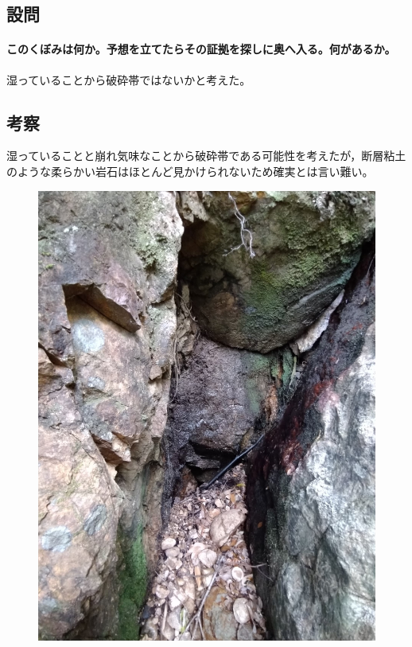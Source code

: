 \documentclass[uplatex,b5paper]{jsreport}
\begin{document}
    \subsection{設問}
      \paragraph{このくぼみは何か。予想を立てたらその証拠を探しに奥へ入る。何があるか。}
      湿っていることから破砕帯ではないかと考えた。
    \subsection{考察}
    湿っていることと崩れ気味なことから破砕帯である可能性を考えたが，断層粘土のような柔らかい岩石はほとんど見かけられないため確実とは言い難い。
    \begin{figure}[h]
      \begin{center}
        \includegraphics[scale=0.1]{files/地学実習/地点4.jpg}

\end{center}
\end{figure}
\end{document}
